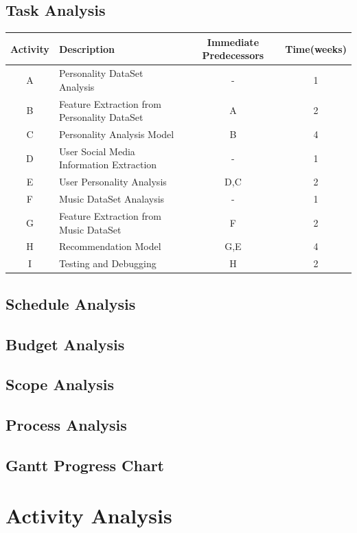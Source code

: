 \documentclass[a4paper, 12pt, onepage]{article}
\begin{document}
	\subsection{Task Analysis}
	\begin{center}
		\begin{tabular}{|c|l|c|c|}
			\hline
				Activity & Description & Immediate Predecessors&Time(weeks)\\
			\hline
			A&Personality DataSet Analysis&-&1\\
			\hline
			B&Feature Extraction from Personality DataSet&A&2\\
			\hline
			C&Personality Analysis Model&B&4\\
			\hline
			D&User Social Media Information Extraction&-&1\\
			\hline
			E&User Personality Analysis&D,C&2\\
			\hline
			F&Music DataSet Analaysis&-&1 \\
			\hline
			G&Feature Extraction from Music DataSet&F&2\\
			\hline
			H&Recommendation Model&G,E&4\\
			\hline
			I&Testing and Debugging&H&2\\
			\hline

		\end{tabular}
	\end{center}
      \subsection{Schedule Analysis}
      \subsection{Budget Analysis}
      \subsection{Scope Analysis}
      \subsection{Process Analysis}
      \subsection{Gantt Progress Chart}

      \cleardoublepage
      \section{Activity Analysis}
\end{document}
